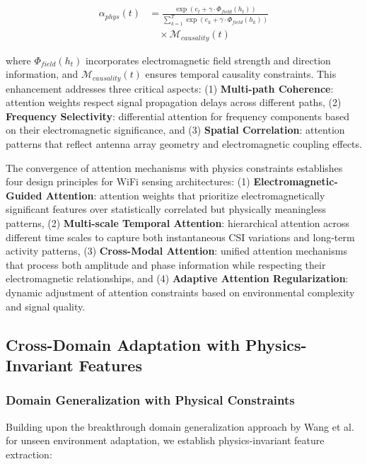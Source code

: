 \documentclass[journal]{IEEEtran}
\begin{document}
\begin{align}
\alpha_{phys}(t) &= \frac{\exp(e_t + \gamma \cdot \Phi_{field}(h_t))}{\sum_{k=1}^{T} \exp(e_k + \gamma \cdot \Phi_{field}(h_k))} \nonumber \\
&\quad \times \mathcal{M}_{causality}(t)
\label{eq:physics_attention}
\end{align}

where $\Phi_{field}(h_t)$ incorporates electromagnetic field strength and direction information, and $\mathcal{M}_{causality}(t)$ ensures temporal causality constraints. This enhancement addresses three critical aspects: (1) \textbf{Multi-path Coherence}: attention weights respect signal propagation delays across different paths, (2) \textbf{Frequency Selectivity}: differential attention for frequency components based on their electromagnetic significance, and (3) \textbf{Spatial Correlation}: attention patterns that reflect antenna array geometry and electromagnetic coupling effects.

The convergence of attention mechanisms with physics constraints establishes four design principles for WiFi sensing architectures: (1) \textbf{Electromagnetic-Guided Attention}: attention weights that prioritize electromagnetically significant features over statistically correlated but physically meaningless patterns, (2) \textbf{Multi-scale Temporal Attention}: hierarchical attention across different time scales to capture both instantaneous CSI variations and long-term activity patterns, (3) \textbf{Cross-Modal Attention}: unified attention mechanisms that process both amplitude and phase information while respecting their electromagnetic relationships, and (4) \textbf{Adaptive Attention Regularization}: dynamic adjustment of attention constraints based on environmental complexity and signal quality.

\subsection{Cross-Domain Adaptation with Physics-Invariant Features}

\subsubsection{Domain Generalization with Physical Constraints}

Building upon the breakthrough domain generalization approach by Wang et al. \cite{wang2022airfi} for unseen environment adaptation, we establish physics-invariant feature extraction:
\end{document}
